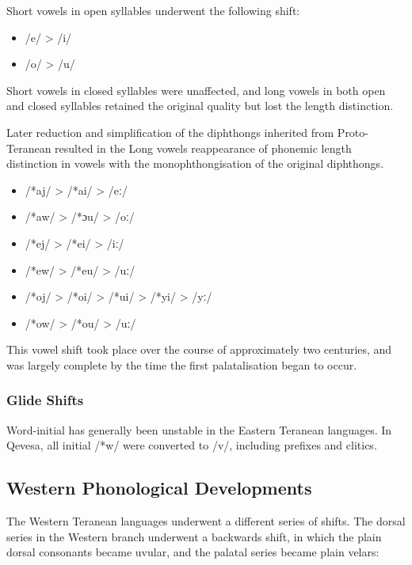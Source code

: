 \documentclass[grammar]{subfiles}
\begin{document}
Short vowels in open syllables underwent the following shift:

\begin{itemize}
  \item /e/ > /i/
  \item /o/ > /u/
\end{itemize}

Short vowels in closed syllables were unaffected, and long vowels in both open
and closed syllables retained the original quality but lost the length
distinction.

Later reduction and simplification of the diphthongs inherited from
Proto-Teranean resulted in the  Long vowels reappearance of phonemic length
distinction in vowels with the monophthongisation of the original diphthongs.

\begin{itemize}
  \item /*aj/ > /*ai/ > /eː/
  \item /*aw/ > /*ɔu/ > /oː/
  \item /*ej/ > /*ei/ > /iː/
  \item /*ew/ > /*eu/ > /uː/
  \item /*oj/ > /*oi/ > /*ui/ > /*yi/ > /yː/
  \item /*ow/ > /*ou/ > /uː/
\end{itemize}

This vowel shift took place over the course of approximately two centuries, and was
largely complete by the time the first palatalisation began to occur.

\Tbw

\subsubsection{Glide Shifts}
\label{sssec:history:east:glide_shifts}

Word-initial  has generally been unstable in the Eastern Teranean
languages.  In Qevesa, all initial /*w/ were converted to /v/, including
prefixes and clitics.

\Tbw
 
\subsection{Western Phonological Developments}
\label{ssec:history:western_developments}

The Western Teranean languages underwent a different series of shifts.  The
dorsal series in the Western branch underwent a backwards shift, in which the
plain dorsal consonants became uvular, and the palatal series became plain
velars: 
\end{document}
